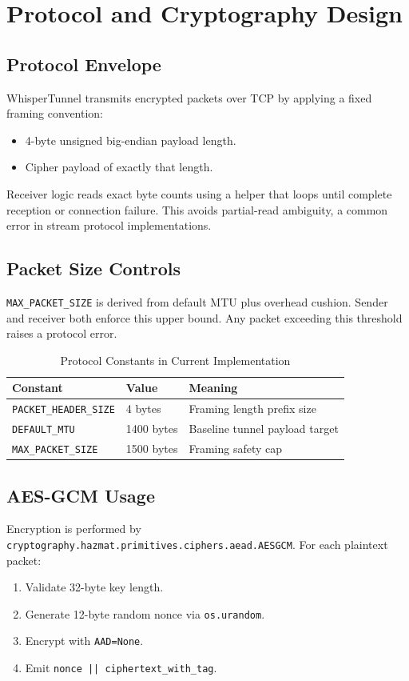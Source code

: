 \chapter{Protocol and Cryptography Design}

\section{Protocol Envelope}
WhisperTunnel transmits encrypted packets over TCP by applying a fixed framing convention:
\begin{itemize}[leftmargin=2em]
\item 4-byte unsigned big-endian payload length.
\item Cipher payload of exactly that length.
\end{itemize}

Receiver logic reads exact byte counts using a helper that loops until complete reception or connection failure. This avoids partial-read ambiguity, a common error in stream protocol implementations.

\section{Packet Size Controls}
\texttt{MAX\_PACKET\_SIZE} is derived from default MTU plus overhead cushion. Sender and receiver both enforce this upper bound. Any packet exceeding this threshold raises a protocol error.

\begin{table}[H]
\centering
\caption{Protocol Constants in Current Implementation}
\begin{tabular}{p{}p{}p{}}
\toprule
\textbf{Constant} & \textbf{Value} & \textbf{Meaning} \\
\midrule
\texttt{PACKET\_HEADER\_SIZE} & 4 bytes & Framing length prefix size \\
\texttt{DEFAULT\_MTU} & 1400 bytes & Baseline tunnel payload target \\
\texttt{MAX\_PACKET\_SIZE} & 1500 bytes & Framing safety cap \\
\bottomrule
\end{tabular}
\end{table}

\section{AES-GCM Usage}
Encryption is performed by \texttt{cryptography.hazmat.primitives.ciphers.aead.AESGCM}. For each plaintext packet:
\begin{enumerate}[leftmargin=2em]
\item Validate 32-byte key length.
\item Generate 12-byte random nonce via \texttt{os.urandom}.
\item Encrypt with \texttt{AAD=None}.
\item Emit \texttt{nonce || ciphertext\_with\_tag}.
\end{enumerate}

